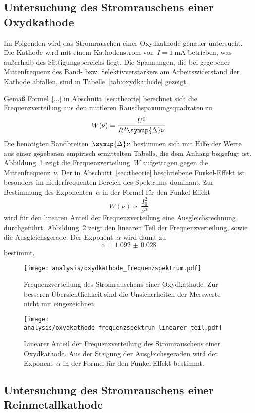 \subsection{Untersuchung des Stromrauschens einer Oxydkathode}

Im Folgenden wird das Stromrauschen einer Oxydkathode genauer untersucht. Die
Kathode wird mit einem Kathodenstrom von~$I=\SI{1}{\milli\ampere}$ betrieben,
was außerhalb des Sättigungsbereichs liegt. Die Spannungen, die bei gegebener
Mittenfrequenz des Band- bzw. Selektivverstärkers am Arbeitswiderstand der
Kathode abfallen, sind in Tabelle~\ref{tab:oxydkathode} gezeigt.

Gemäß Formel~\ref{...} in Abschnitt~\ref{sec:theorie} berechnet sich die
Frequenzverteilung aus den mittleren Rauschspannungsquadraten zu
%
\begin{equation}
  W(\nu)=\frac{\bar{U}^2}{R^2\symup{\Delta}\nu}
\end{equation}
%
Die benötigten Bandbreiten~$\symup{\Delta}\nu$ bestimmen sich mit Hilfe der
Werte aus einer gegebenen empirisch ermittelten Tabelle, die dem Anhang
beigefügt ist. Abbildung~\ref{fig:oxydkathode_frequenzspektrum} zeigt die
Frequenzverteilung~$W$ aufgetragen gegen die Mittenfrequenz~$\nu$. Der in
Abschnitt~\ref{sec:theorie} beschriebene Funkel-Effekt ist besonders im
niederfrequenten Bereich des Spektrums dominant. Zur Bestimmung des
Exponenten~$\alpha$ in der Formel für den Funkel-Effekt
%
\begin{equation}
  W(\nu)\propto\frac{I_0^2}{\nu^{\alpha}}
\end{equation}
%
wird für den linearen Anteil der Frequenzverteilung eine Ausgleichsrechnung
durchgeführt. Abbildung~\ref{fig:oxydkathode_frequenzspektrum_linearer_teil}
zeigt den linearen Teil der Frequenzverteilung, sowie die Ausgleichsgerade. Der
Exponent~$\alpha$ wird damit zu
%
\begin{equation}
  \alpha=\num{1.092(28)}
\end{equation}
%
bestimmt.

\begin{figure}
  \texttt{[image: analysis/oxydkathode\_frequenzspektrum.pdf]}
  \caption{Frequenzverteilung des Stromrauschens einer Oxydkathode. Zur besseren
  Übersichtlichkeit sind die Unsicherheiten der Messwerte nicht mit
  eingezeichnet.}
  \label{fig:oxydkathode_frequenzspektrum}
\end{figure}

\begin{figure}
  \texttt{[image: analysis/oxydkathode\_frequenzspektrum\_linearer\_teil.pdf]}
  \caption{Linearer Anteil der Frequenzverteilung des Stromrauschens einer
  Oxydkathode. Aus der Steigung der Ausgleichsgeraden wird der Exponent~$\alpha$
  in der Formel für den Funkel-Effekt bestimmt.}
  \label{fig:oxydkathode_frequenzspektrum_linearer_teil}
\end{figure}

\subsection{Untersuchung des Stromrauschens einer Reinmetallkathode}
